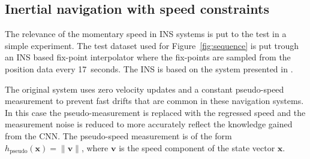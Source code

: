 \documentclass{article}
\providecommand{\norm}[1]{\|#1\|}
\newcommand{\mbf}[1]{\mathbf{#1}}
\newcommand{\vect}[1]{\mbf{#1}}
\begin{document}

\subsection{Inertial navigation with speed constraints}
\label{sec:ins}
The relevance of the momentary speed in INS systems is put to the test in a simple experiment. The test dataset used for Figure~\ref{fig:sequence} is put trough an INS based fix-point interpolator where the fix-points are sampled from the position data every 17~seconds. The INS is based on the system presented in \cite{Solin+Cortes+Rahtu+Kannala}.

The original system uses zero velocity updates and a constant pseudo-speed measurement to prevent fast drifts that are common in these navigation systems. In this case the pseudo-measurement is replaced with the regressed speed and the measurement noise is reduced to more accurately reflect the knowledge gained from the CNN. The pseudo-speed measurement is of the form  $h_\text{pseudo}(\vect{x}) = \norm{\vect{v}}$, where $\vect{v}$ is the speed component of the state vector $\vect{x}$.
\end{document}
